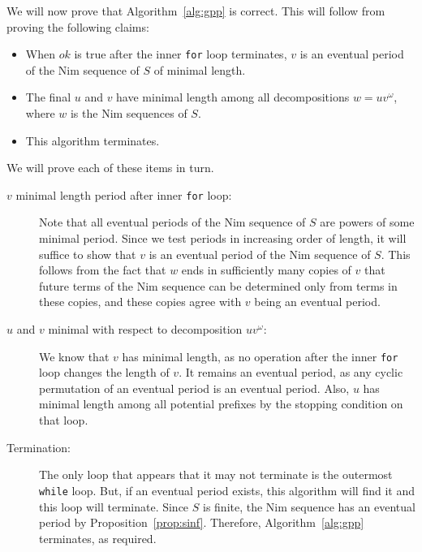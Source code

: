 \documentclass[english,12pt]{article}
\begin{document}
\FloatBarrier
We will now prove that Algorithm~\ref{alg:gpp} is correct.  This will follow from proving the following claims:
\begin{itemize}
\item When $ok$ is true after the inner \texttt{for} loop terminates, $v$ is an eventual period of the Nim sequence of $S$ of minimal length.
\item The final $u$ and $v$ have minimal length among all decompositions $w=uv^\omega$, where $w$ is the Nim sequences of $S$.
\item This algorithm terminates.
\end{itemize}
We will prove each of these items in turn.
\begin{description}
\item[$v$ minimal length period after inner \texttt{for} loop:] Note that all eventual periods of the Nim sequence of $S$ are powers of some minimal period.  Since we test periods in increasing order of length, it will suffice to show that $v$ is an eventual period of the Nim sequence of $S$.  This follows from the fact that $w$ ends in sufficiently many copies of $v$ that future terms of the Nim sequence can be determined only from terms in these copies, and these copies agree with $v$ being an eventual period.
\item[$u$ and $v$ minimal with respect to decomposition $uv^\omega$:] We know that $v$ has minimal length, as no operation after the inner \texttt{for} loop changes the length of $v$.  It remains an eventual period, as any cyclic permutation of an eventual period is an eventual period.  Also, $u$ has minimal length among all potential prefixes by the stopping condition on that loop.
\item[Termination:] The only loop that appears that it may not terminate is the outermost \texttt{while} loop.  But, if an eventual period exists, this algorithm will find it and this loop will terminate.  Since $S$ is finite, the Nim sequence has an eventual period by Proposition~\ref{prop:sinf}.  Therefore, Algorithm~\ref{alg:gpp} terminates, as required.
\end{description}
\end{document}
